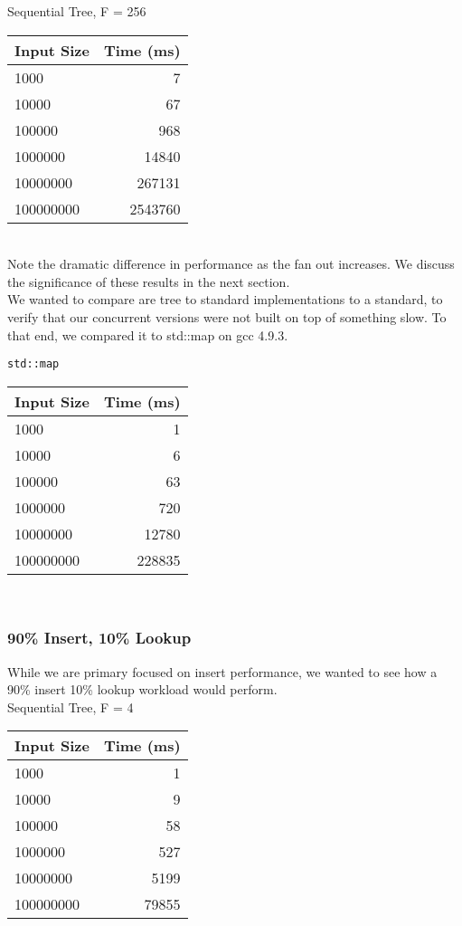 \documentclass{sig-alternate}
\begin{document}
Sequential Tree, F = 256\\
\begin{tabular}{| l | r |}
  \hline
  Input Size & Time (ms)\\  \hline
  1000			&	7	\\
  10000			&	67	\\
  100000		&	968	\\
  1000000		&	14840	\\
  10000000		&	267131	\\
  100000000		&	2543760	\\
  \hline
\end{tabular}\\

Note the dramatic difference in performance as the fan out increases. 
We discuss the significance of these results in the next section.\\

We wanted to compare are tree to standard implementations to a standard, to verify that our concurrent versions were not built on top of something slow.  To that end, we compared it to std::map on gcc 4.9.3.

\texttt{std::map}\\
\begin{tabular}{| l | r |}
  \hline
  Input Size & Time (ms)\\  \hline
  1000			&	1	\\
  10000			&	6	\\
  100000		&	63	\\
  1000000		&	720	\\
  10000000		&	12780	\\
  100000000		&	228835	\\
  \hline
\end{tabular}\\

\subsubsection{90\% Insert, 10\% Lookup}
While we are primary focused on insert performance, we wanted to see how a 90\% insert 10\% lookup workload would perform.\\
Sequential Tree, F = 4\\
\begin{tabular}{| l | r |}
  \hline
  Input Size & Time (ms)\\  \hline
  1000			&	1	\\
  10000			&	9	\\
  100000		&	58	\\
  1000000		&	527	\\
  10000000		&	5199	\\
  100000000		&	79855	\\
  \hline
\end{tabular} \\
\end{document}
